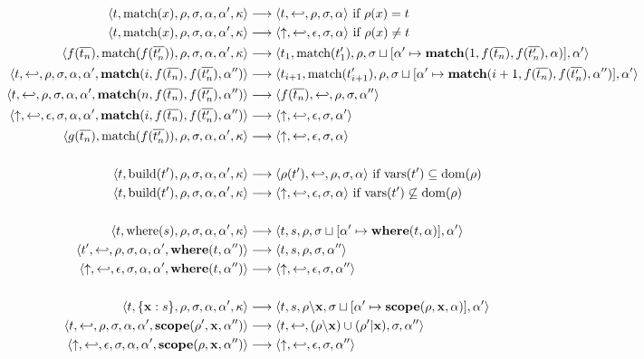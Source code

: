 \documentclass{article}
\begin{document}
{\begin{align*}
  \langle t,\text{match}(x),\rho,\sigma,\alpha,\alpha',\kappa \rangle & \longrightarrow \langle t,\hookleftarrow,\rho,\sigma,\alpha \rangle \text{ if } \rho(x) = t \\
  \langle t,\text{match}(x),\rho,\sigma,\alpha,\alpha',\kappa \rangle & \longrightarrow \langle \uparrow,\hookleftarrow,\epsilon,\sigma,\alpha \rangle \text{ if } \rho(x) \neq t \\
  \langle f(\overline{t_n}),\text{match}(f(\overline{t_n'})),\rho,\sigma,\alpha,\alpha',\kappa \rangle & \longrightarrow \langle t_1,\text{match}(t_1'),\rho,\sigma\sqcup[\alpha' \mapsto \mathbf{match}(1,f(\overline{t_n}),f(\overline{t_n'}),\alpha)],\alpha' \rangle \\
  \langle t,\hookleftarrow,\rho,\sigma,\alpha,\alpha',\mathbf{match}(i,f(\overline{t_n}),f(\overline{t_n'}),\alpha'') \rangle & \longrightarrow \langle t_{i+1},\text{match}(t_{i+1}'),\rho,\sigma\sqcup[\alpha' \mapsto \mathbf{match}(i+1,f(\overline{t_n}),f(\overline{t_n'}),\alpha'')],\alpha' \rangle \\
  \langle t,\hookleftarrow,\rho,\sigma,\alpha,\alpha',\mathbf{match}(n,f(\overline{t_n}),f(\overline{t_n'}),\alpha'') \rangle & \longrightarrow \langle f(\overline{t_n}),\hookleftarrow,\rho,\sigma,\alpha'' \rangle \\
  \langle \uparrow,\hookleftarrow,\epsilon,\sigma,\alpha,\alpha',\mathbf{match}(i,f(\overline{t_n}),f(\overline{t_n'}),\alpha'') \rangle & \longrightarrow \langle \uparrow,\hookleftarrow,\epsilon,\sigma,\alpha' \rangle \\
  \langle g(\overline{t_n}),\text{match}(f(\overline{t_n'})),\rho,\sigma,\alpha,\alpha',\kappa \rangle & \longrightarrow \langle \uparrow,\hookleftarrow,\epsilon,\sigma,\alpha \rangle \\
  \notag \\
  \langle t,\text{build}(t'),\rho,\sigma,\alpha,\alpha',\kappa \rangle & \longrightarrow \langle \rho(t'),\hookleftarrow,\rho,\sigma,\alpha \rangle \text{ if } \text{vars}(t') \subseteq \text{dom}(\rho) \\
  \langle t,\text{build}(t'),\rho,\sigma,\alpha,\alpha',\kappa \rangle & \longrightarrow \langle \uparrow,\hookleftarrow,\epsilon,\sigma,\alpha \rangle \text{ if } \text{vars}(t') \not\subseteq \text{dom}(\rho) \\
  \notag \\
  \langle t,\text{where}(s),\rho,\sigma,\alpha,\alpha',\kappa \rangle & \longrightarrow \langle t,s,\rho,\sigma\sqcup[\alpha' \mapsto \mathbf{where}(t,\alpha)],\alpha' \rangle \\
  \langle t',\hookleftarrow,\rho,\sigma,\alpha,\alpha',\mathbf{where}(t,\alpha'') \rangle & \longrightarrow \langle t,s,\rho,\sigma,\alpha'' \rangle \\
  \langle \uparrow,\hookleftarrow,\epsilon,\sigma,\alpha,\alpha',\mathbf{where}(t,\alpha'') \rangle & \longrightarrow \langle \uparrow,\hookleftarrow,\epsilon,\sigma,\alpha'' \rangle \\
  \notag \\
  \langle t,\lbrace \mathbf{x} : s \rbrace,\rho,\sigma,\alpha,\alpha',\kappa \rangle & \longrightarrow \langle t,s,\rho \backslash \mathbf{x},\sigma\sqcup[\alpha' \mapsto \mathbf{scope}(\rho,\mathbf{x},\alpha)],\alpha' \rangle \\
  \langle t,\hookleftarrow,\rho,\sigma,\alpha,\alpha',\mathbf{scope}(\rho',\mathbf{x},\alpha'') \rangle & \longrightarrow \langle t,\hookleftarrow,(\rho \backslash \mathbf{x}) \cup (\rho' | \mathbf{x}),\sigma,\alpha'' \rangle \\
  \langle \uparrow,\hookleftarrow,\epsilon,\sigma,\alpha,\alpha',\mathbf{scope}(\rho,\mathbf{x},\alpha'') \rangle & \longrightarrow \langle \uparrow,\hookleftarrow,\epsilon,\sigma,\alpha'' \rangle \\
\end{align*}

}
\end{document}
